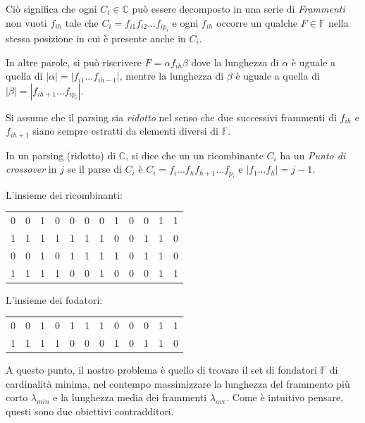 Ciò significa che ogni $C_i \in \mathbb{C}$ può essere decomposto in una serie di \textit{Frammenti} non vuoti $f_{ih}$ tale che $C_i=f_{i1}f_{i2}...f_{ip_i}$ e ogni $f_{ih}$ occorre un qualche $F \in \mathbb{F}$ nella stessa posizione in cui è presente anche in $C_i$. 

In altre parole, si può riscrivere $F=\alpha f_{ih} \beta$ dove la lunghezza di $\alpha$ è uguale a quella di $|\alpha|=|f_{i1}...f_{ih-1}|$, mentre la lunghezza di $\beta$ è uguale a quella di $|\beta|=|f_{ih+1}...f_{ip_i}|$.

Si assume che il parsing sia \textit{ridotto} nel senso che due successivi frammenti di $f_{ih}$ e $f_{ih+1}$ siano sempre estratti da elementi diversi di $\mathbb{F}$.

In un parsing (ridotto) di $\mathbb{C}$, si dice che un un ricombinante $C_i$ ha un \textit{Punto di crossover} in $j$ se il parse di $C_i$ è  $C_i=f_i...f_hf_{h+1}...f_{p_i}$ e $|f_1...f_h|=j-1$.

\begin{example}
L'insieme dei ricombinanti:
\begin{center}
  \begin{tabular}{ c c c c c c c c c c c c}
    0 & 0 & 1 & 0 & 0 & 0 & 0 & 1 & 0 & 0 & 1 & 1 \\ 
    1 & 1 & 1 & 1 & 1 & 1 & 1 & 0 & 0 & 1 & 1 & 0 \\
    0 & 0 & 1 & 0 & 1 & 1 & 1 & 1 & 0 & 1 & 1 & 0 \\ 
    1 & 1 & 1 & 1 & 0 & 0 & 1 & 0 & 0 & 0 & 1 & 1 \\
  \end{tabular}
\end{center}

L'insieme dei fodatori:
\begin{center}
  \begin{tabular}{ c c c c c c c c c c c c}
    0 & 0 & 1 & 0 & 1 & 1 & 1 & 0 & 0 & 0 & 1 & 1 \\ 
    1 & 1 & 1 & 1 & 0 & 0 & 0 & 1 & 0 & 1 & 1 & 0 \\
  \end{tabular}
\end{center}
\end{example}

\newpage

A questo punto, il nostro problema è quello di trovare il set di fondatori $\mathbb{F}$ di cardinalità minima, nel contempo massimizzare la lunghezza del frammento più corto $\lambda_{min}$ e la lunghezza media dei frammenti $\lambda_{ave}$. Come è intuitivo pensare, questi sono due obiettivi contradditori.

